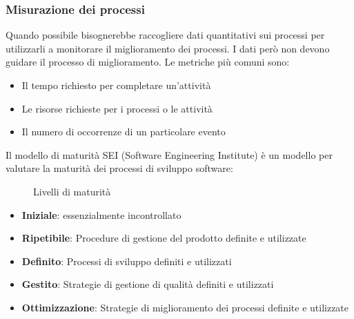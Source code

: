 \documentclass[a4paper]{article}
\begin{document}
\subsubsection{Misurazione dei processi}
Quando possibile bisognerebbe raccogliere dati quantitativi sui processi per utilizzarli
a monitorare il miglioramento dei processi. I dati però non devono guidare il processo
di miglioramento. Le metriche più comuni sono:
\begin{itemize}
  \item Il tempo richiesto per completare un'attività
  \item Le risorse richieste per i processi o le attività
  \item Il numero di occorrenze di un particolare evento
\end{itemize}
Il modello di maturità SEI (Software Engineering Institute) è un modello per valutare
la maturità dei processi di sviluppo software:
\begin{figure}[H]
  \centering
  \caption{Livelli di maturità}
\end{figure}
\begin{itemize}
  \item \textbf{Iniziale}: essenzialmente incontrollato
  \item \textbf{Ripetibile}: Procedure di gestione del prodotto definite e utilizzate
  \item \textbf{Definito}: Processi di sviluppo definiti e utilizzati
  \item \textbf{Gestito}: Strategie di gestione di qualità definiti e utilizzati
  \item \textbf{Ottimizzazione}: Strategie di miglioramento dei processi definite e 
    utilizzate
\end{itemize}
\end{document}
